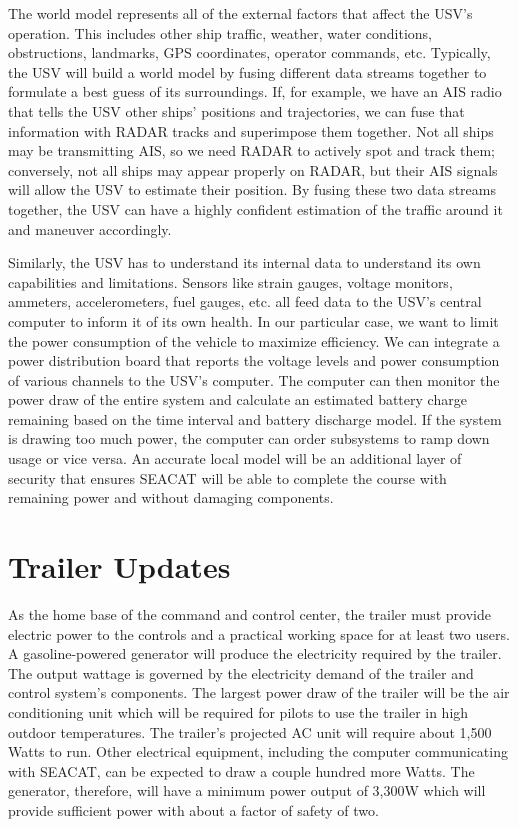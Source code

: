 \documentclass[12pt]{article}
\begin{document}
    The world model represents all of the external factors that affect the USV's operation.
    This includes other ship traffic, weather, water conditions, obstructions, landmarks, GPS coordinates, operator commands, etc.
    Typically, the USV will build a world model by fusing different data streams together to formulate a best guess of its surroundings.
    If, for example, we have an AIS radio that tells the USV other ships' positions and trajectories, we can fuse that information with RADAR tracks and superimpose them together.
    Not all ships may be transmitting AIS, so we need RADAR to actively spot and track them; conversely, not all ships may appear properly on RADAR, but their AIS signals will allow the USV to estimate their position.
    By fusing these two data streams together, the USV can have a highly confident estimation of the traffic around it and maneuver accordingly.

    Similarly, the USV has to understand its internal data to understand its own capabilities and limitations.
    Sensors like strain gauges, voltage monitors, ammeters, accelerometers, fuel gauges, etc. all feed data to the USV's central computer to inform it of its own health.
    In our particular case, we want to limit the power consumption of the vehicle to maximize efficiency.
    We can integrate a power distribution board that reports the voltage levels and power consumption of various channels to the USV's computer.
    The computer can then monitor the power draw of the entire system and calculate an estimated battery charge remaining based on the time interval and battery discharge model.
    If the system is drawing too much power, the computer can order subsystems to ramp down usage or vice versa.
    An accurate local model will be an additional layer of security that ensures SEACAT will be able to complete the course with remaining power and without damaging components.    

\section{Trailer Updates} %
As the home base of the command and control center, the trailer must provide electric power to the controls and a practical working space for at least two users. 
A gasoline-powered generator will produce the electricity required by the trailer. 
The output wattage is governed by the electricity demand of the trailer and control system's components. 
The largest power draw of the trailer will be the air conditioning unit which will be required for pilots to use the trailer in high outdoor temperatures. 
The trailer's projected AC unit will require about 1,500 Watts to run. 
Other electrical equipment, including the computer communicating with SEACAT, can be expected to draw a couple hundred more Watts. 
The generator, therefore, will have a minimum power output of 3,300W which will provide sufficient power with about a factor of safety of two.
\end{document}
